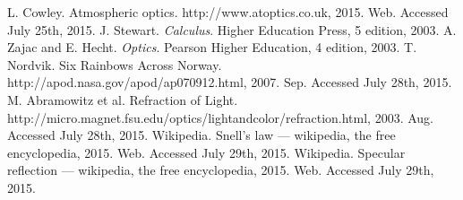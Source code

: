 \documentclass{article}
\begin{document}
\begin{spacing}{2.0}
\begin{thebibliography}{0}
L. Cowley. Atmospheric optics. http://www.atoptics.co.uk, 2015. Web. Accessed July 25th, 2015.
J. Stewart. \emph{Calculus}. Higher Education Press, 5 edition, 2003.
A. Zajac and E. Hecht. \emph{Optics}. Pearson Higher Education, 4 edition, 2003.
T. Nordvik. Six Rainbows Across Norway. http://apod.nasa.gov/apod/ap070912.html, 2007. Sep. Accessed July 28th, 2015. 
M. Abramowitz et al. Refraction of Light. http://micro.magnet.fsu.edu/optics/lightandcolor/refraction.html, 2003. Aug. Accessed July 28th, 2015.
Wikipedia. Snell's law — wikipedia, the free encyclopedia, 2015. Web.
Accessed July 29th, 2015.
Wikipedia. Specular reflection — wikipedia, the free encyclopedia, 2015. Web.
Accessed July 29th, 2015.


\end{thebibliography}
\end{spacing}
\end{document}
